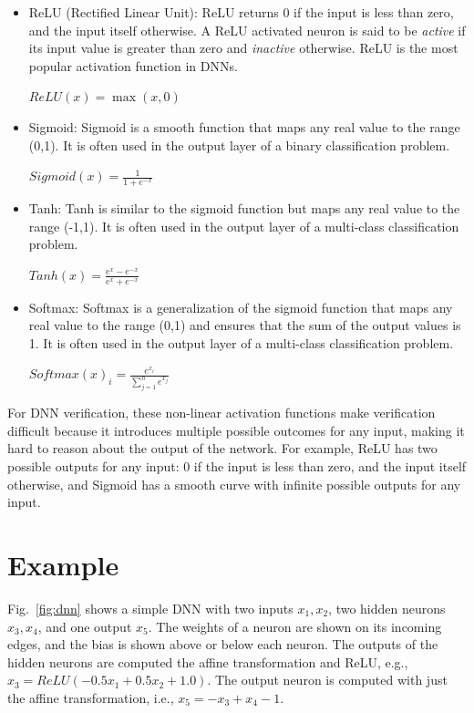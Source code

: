 \documentclass[oneside,11pt,dvipsnames]{book}
\begin{document}
\begin{itemize}
\item ReLU (Rectified Linear Unit):  ReLU returns 0 if the input is less than zero, and the input itself otherwise. 
A ReLU activated neuron is said to be \emph{active} if its input value is greater than zero and \emph{inactive} otherwise.
ReLU is the most popular activation function in DNNs.\\
    \begin{center}
        $ReLU(x) = \max(x,0)$
    \end{center}


    
    
\item Sigmoid: Sigmoid is a smooth function that maps any real value to the range (0,1). It is often used in the output layer of a binary classification problem.\\
    \begin{center}
        $Sigmoid(x) = \frac{1}{1+e^{-x}}$
    \end{center}
\item Tanh: Tanh is similar to the sigmoid function but maps any real value to the range (-1,1). It is often used in the output layer of a multi-class classification problem.\\
    \begin{center}
        $Tanh(x) = \frac{e^x-e^{-x}}{e^x+e^{-x}}$
    \end{center}
\item Softmax: Softmax is a generalization of the sigmoid function that maps any real value to the range (0,1) and ensures that the sum of the output values is 1. It is often used in the output layer of a multi-class classification problem.\\
    \begin{center}
    $Softmax(x)_i = \frac{e^{x_i}}{\sum_{j=1}^{n}e^{x_j}}$
    \end{center}
\end{itemize}

For DNN verification, these non-linear activation functions make verification difficult because it introduces multiple possible outcomes for any input, making it hard to reason about the output of the network. For example, ReLU has two possible outputs for any input: 0 if the input is less than zero, and the input itself otherwise, and Sigmoid has a smooth curve with infinite possible outputs for any input.


\section{Example} 
Fig.~\ref{fig:dnn} shows a simple DNN with two inputs $x_1,x_2$, two hidden neurons $x_3,x_4$, and one output $x_5$. The weights of a neuron are shown on its incoming edges, and the bias is shown above or below each neuron. The outputs of the hidden neurons  are computed the affine transformation and ReLU, e.g., $x_3 = ReLU(-0.5x_1+0.5x_2+1.0)$. The output neuron is computed with just the affine transformation, i.e., $x_5=-x_3+x_4-1$.
\end{document}
